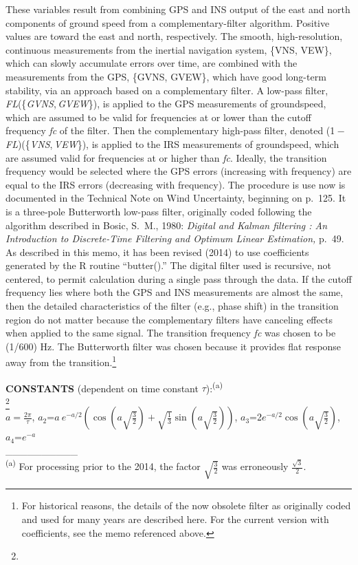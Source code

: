 \documentclass[
]{book}
\begin{document}
These variables result from combining GPS and INS output of the east and north components of ground speed from a \protect\hypertarget{compFilter}{}{complementary-filter} algorithm. Positive values are toward the east and north, respectively. The smooth, high-resolution, continuous measurements from the inertial navigation system, \{VNS, VEW\}, which can slowly accumulate errors over time, are combined with the measurements from the GPS, \{GVNS, GVEW\}, which have good long-term stability, via an approach based on a complementary filter. A low-pass filter, {\emph{F}\emph{L}(\{\emph{GVNS}, \emph{GVEW}\})}, is applied to the GPS measurements of groundspeed, which are assumed to be valid for frequencies at or lower than the cutoff frequency {\emph{f}\emph{c}} of the filter. Then the complementary high-pass filter, denoted ({1 − \emph{F}\emph{L}})({\{\emph{VNS}, \emph{VEW}\}}), is applied to the IRS measurements of groundspeed, which are assumed valid for frequencies at or higher than {\emph{f}\emph{c}}. Ideally, the transition frequency would be selected where the GPS errors (increasing with frequency) are equal to the IRS errors (decreasing with frequency).
The procedure is use now is documented in the Technical Note on Wind Uncertainty, beginning on p.~125. It is a three-pole Butterworth low-pass filter, originally coded following the algorithm described in Bosic, S.~M., 1980: \emph{Digital and Kalman filtering : An Introduction to Discrete-Time Filtering and Optimum Linear Estimation,} p.~49. As described in this memo, it has been revised (2014) to use coefficients generated by the R routine ``butter().'' The digital filter used is recursive, not centered, to permit calculation during a single pass through the data. If the cutoff frequency lies where both the GPS and INS measurements are almost the same, then the detailed characteristics of the filter (e.g., phase shift) in the transition region do not matter because the complementary filters have canceling effects when applied to the same signal. The transition frequency {\emph{f}\emph{c}} was chosen to be (1/600) Hz. The Butterworth filter was chosen because it provides flat response away from the transition.\footnote{For historical reasons, the details of the now obsolete filter as originally coded and used for many years are described here. For the current version with coefficients, see the memo referenced above.}

\textbf{CONSTANTS} (dependent on time constant \(\tau\)):\textsuperscript{(a)}\\
\footnote{}\\
\(a=\frac{2\pi}{\tau}\),
\(a_{2}\)=\(a\ e^{-a/2}(\cos(a\sqrt{\frac{3}{2}})+\sqrt{\frac{1}{3}}\sin(a\sqrt{\frac{3}{2}}))\),
\(a_{3}\)=2\(e^{-a/2}\)\(\cos(a\sqrt{\frac{3}{2}})\), \(a_{4}\)=\(e^{-a}\)\\
\_\_\_\_\_\_\_\_\_\_\\
\textsuperscript{(a)} For processing prior to the 2014, the factor \(\sqrt{\frac{3}{2}}\)
was erroneously \(\frac{\sqrt{3}}{2}\).
\end{document}
